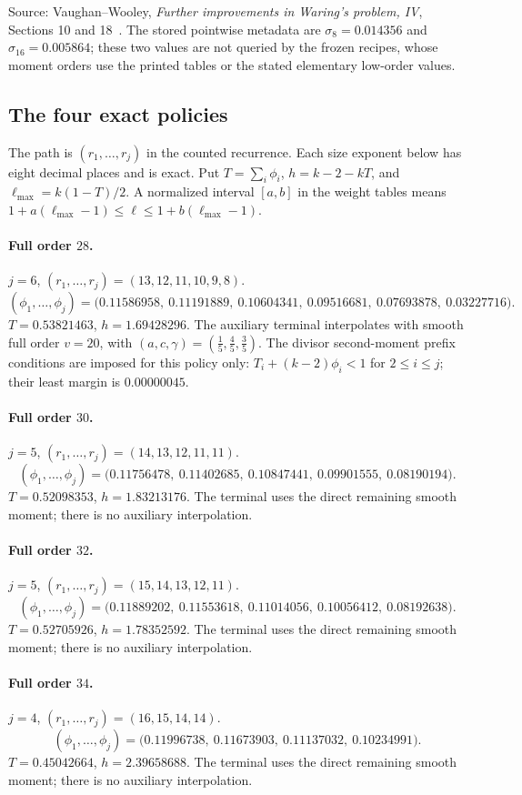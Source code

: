 \documentclass[11pt,letterpaper]{article}
\numberwithin{equation}{section}
\begin{document}
Source: Vaughan--Wooley, \emph{Further improvements in Waring's problem, IV}, Sections 10 and 18~\cite{VW00}.
The stored pointwise metadata are $\sigma_{8}=0.014356$ and $\sigma_{16}=0.005864$; these two values are not queried by the frozen recipes, whose moment orders use the printed tables or the stated elementary low-order values.
\subsection{The four exact policies}
The path is $(r_1,\ldots,r_j)$ in the counted recurrence.
Each size exponent below has eight decimal places and is exact.
Put $T=\sum_i\phi_i$, $h=k-2-kT$, and $\ell_{\max}=k(1-T)/2$.
A normalized interval $[a,b]$ in the weight tables means
$1+a(\ell_{\max}-1)\le\ell\le1+b(\ell_{\max}-1)$.
\paragraph{Full order $28$.}
$j=6$, $(r_1,\ldots,r_j)=(13,12,11,10,9,8)$.
\[ (\phi_1,\ldots,\phi_j)=\bigl(0.11586958,\ 0.11191889,\ 0.10604341,\ 0.09516681,\ 0.07693878,\ 0.03227716\bigr). \]
$T=0.53821463$, $h=1.69428296$.
The auxiliary terminal interpolates with smooth full order $v=20$,
with $(a,c,\gamma)=(\frac{1}{5},\frac{4}{5},\frac{3}{5})$.
The divisor second-moment prefix conditions are imposed for this policy only:
$T_i+(k-2)\phi_i<1$ for $2\le i\le j$; their least margin is $0.00000045$.
\paragraph{Full order $30$.}
$j=5$, $(r_1,\ldots,r_j)=(14,13,12,11,11)$.
\[ (\phi_1,\ldots,\phi_j)=\bigl(0.11756478,\ 0.11402685,\ 0.10847441,\ 0.09901555,\ 0.08190194\bigr). \]
$T=0.52098353$, $h=1.83213176$.
The terminal uses the direct remaining smooth moment; there is no auxiliary interpolation.
\paragraph{Full order $32$.}
$j=5$, $(r_1,\ldots,r_j)=(15,14,13,12,11)$.
\[ (\phi_1,\ldots,\phi_j)=\bigl(0.11889202,\ 0.11553618,\ 0.11014056,\ 0.10056412,\ 0.08192638\bigr). \]
$T=0.52705926$, $h=1.78352592$.
The terminal uses the direct remaining smooth moment; there is no auxiliary interpolation.
\paragraph{Full order $34$.}
$j=4$, $(r_1,\ldots,r_j)=(16,15,14,14)$.
\[ (\phi_1,\ldots,\phi_j)=\bigl(0.11996738,\ 0.11673903,\ 0.11137032,\ 0.10234991\bigr). \]
$T=0.45042664$, $h=2.39658688$.
The terminal uses the direct remaining smooth moment; there is no auxiliary interpolation.
\end{document}
